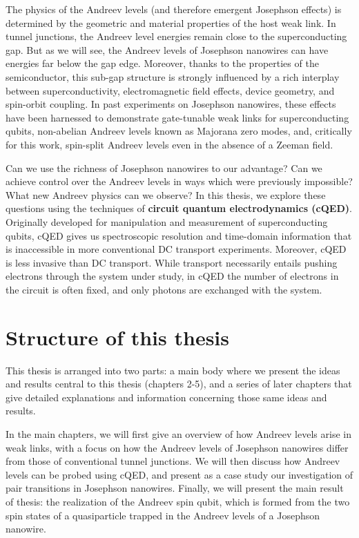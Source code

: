 The physics of the Andreev levels (and therefore emergent Josephson effects) is determined by the geometric and material properties of the host weak link. 
In tunnel junctions, the Andreev level energies remain close to the superconducting gap. 
But as we will see, the Andreev levels of Josephson nanowires can have energies far below the gap edge. 
Moreover, thanks to the properties of the semiconductor, this sub-gap structure is strongly influenced by a rich interplay between superconductivity, electromagnetic field effects, device geometry, and spin-orbit coupling.
In past experiments on Josephson nanowires, these effects have been harnessed to demonstrate gate-tunable weak links for superconducting qubits, non-abelian Andreev levels known as Majorana zero modes, and, critically for this work, spin-split Andreev levels even in the absence of a Zeeman field. 

Can we use the richness of Josephson nanowires to our advantage? 
Can we achieve control over the Andreev levels in ways which were previously impossible? 
What new Andreev physics can we observe?
In this thesis, we explore these questions using the techniques of \textbf{circuit quantum electrodynamics (cQED)}.
Originally developed for manipulation and measurement of superconducting qubits, cQED gives us spectroscopic resolution and time-domain information that is inaccessible in more conventional DC transport experiments. 
Moreover, cQED is less invasive than DC transport. 
While transport necessarily entails pushing electrons through the system under study, in cQED the number of electrons in the circuit is often fixed, and only photons are exchanged with the system. 

\section{Structure of this thesis}

This thesis is arranged into two parts: a main body where we present the ideas and results central to this thesis (chapters 2-5), and a series of later chapters that give detailed explanations and information concerning those same ideas and results. 

In the main chapters, we will first give an overview of how Andreev levels arise in weak links, with a focus on how the Andreev levels of Josephson nanowires differ from those of conventional tunnel junctions. 
We will then discuss how Andreev levels can be probed using cQED, and present as a case study our investigation of pair transitions in Josephson nanowires. 
Finally, we will present the main result of thesis: the realization of the Andreev spin qubit, which is formed from the two spin states of a quasiparticle trapped in the Andreev levels of a Josephson nanowire.  
